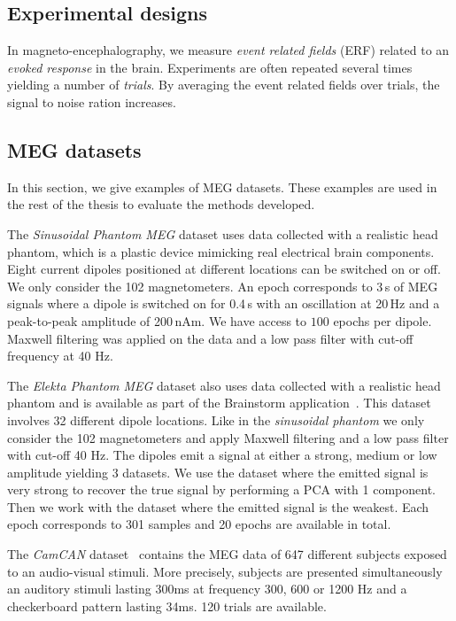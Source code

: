 \subsection{Experimental designs}
In magneto-encephalography, we measure \emph{event related fields} (ERF) related to an
\emph{evoked response} in the brain.
Experiments are often repeated several times yielding a number of \emph{trials}.
By averaging the event related fields over trials, the signal to noise ration increases.

\subsection{MEG datasets}
\label{sec:meg:datasets}
In this section, we give examples of MEG datasets. These examples are used in
the rest of the thesis to evaluate the methods developed.

The \emph{Sinusoidal Phantom MEG} dataset uses data collected with a realistic head phantom, which is a plastic device mimicking real electrical brain components.
% 
Eight current dipoles positioned at different locations can be switched on or off.
% 
We only consider the 102 magnetometers.
% 
An epoch corresponds to 3\,s of MEG signals where a dipole is switched on for 0.4\,s with an oscillation at 20\,Hz and a peak-to-peak amplitude of 200\,nAm.
% 
We have access to $100$ epochs per dipole.
%
Maxwell filtering was applied on the data and a low pass filter with cut-off
frequency at 40 Hz.

The \emph{Elekta Phantom MEG} dataset also uses data collected with a realistic
head phantom and is available as part of the Brainstorm
application~\cite{tadel2011brainstorm}.
This dataset involves 32 different dipole locations. Like in the
\emph{sinusoidal phantom} we only
consider the 102 magnetometers and apply Maxwell filtering and a low pass filter
with cut-off 40 Hz. The dipoles emit a signal at either a strong, medium or low
amplitude yielding 3 datasets.
We use the dataset where the emitted signal is very strong to recover the true signal
by performing a PCA with 1 component.
Then we work with the dataset where the emitted signal is the weakest.
Each epoch corresponds to 301 samples and 20 epochs are available in total.

The \emph{CamCAN} dataset~\cite{shafto2014cambridge}
contains the MEG data of 647 different
subjects exposed to an audio-visual stimuli. More precisely, subjects are presented simultaneously an
auditory stimuli lasting 300ms at frequency 300, 600 or 1200 Hz  and a
checkerboard pattern lasting 34ms. 120 trials are available.

